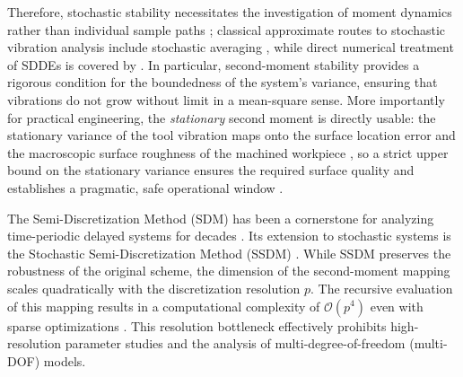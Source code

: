\documentclass[preprint,12pt]{elsarticle}
\begin{document}
Therefore, stochastic stability necessitates the investigation of moment dynamics rather than individual sample paths \cite{Arnold1973, Khasminskii2011, Mao2007}; classical approximate routes to stochastic vibration analysis include stochastic averaging \cite{Roberts1986}, while direct numerical treatment of SDDEs is covered by \cite{Kloeden1992, Higham2001, Buckwar2000}. In particular, second-moment stability provides a rigorous condition for the boundedness of the system's variance, ensuring that vibrations do not grow without limit in a mean-square sense. More importantly for practical engineering, the \emph{stationary} second moment is directly usable: the stationary variance of the tool vibration maps onto the surface location error and the macroscopic surface roughness of the machined workpiece \cite{HoneycuttSchmitz2017, Fodor2020, Fodor2024_PSD}, so a strict upper bound on the stationary variance ensures the required surface quality and establishes a pragmatic, safe operational window \cite{Sykora2020b, Fodor2024_PSD}.

The Semi-Discretization Method (SDM) has been a cornerstone for analyzing time-periodic delayed systems for decades \cite{Insperger2002, Insperger2011, Bachrathy2013}. Its extension to stochastic systems is the Stochastic Semi-Discretization Method (SSDM) \cite{Sykora2019, Sykora2020a, Sykora2020b, Fodor2023_PEM}. While SSDM preserves the robustness of the original scheme, the dimension of the second-moment mapping scales quadratically with the discretization resolution $p$. The recursive evaluation of this mapping results in a computational complexity of $\mathcal{O}(p^4)$ even with sparse optimizations \cite{Sykora2019}. This resolution bottleneck effectively prohibits high-resolution parameter studies and the analysis of multi-degree-of-freedom (multi-DOF) models.
\end{document}
